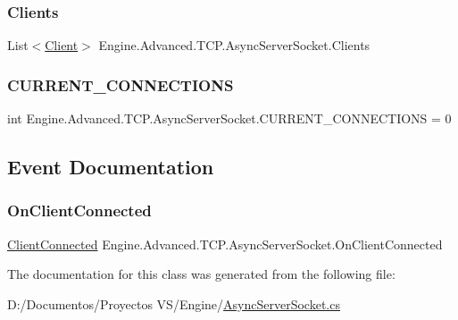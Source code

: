 \subsubsection{\texorpdfstring{Clients}{Clients}}
{\footnotesize\ttfamily List$<$\mbox{\hyperlink{class_engine_1_1_advanced_1_1_t_c_p_1_1_async_server_socket_1_1_client}{Client}}$>$ Engine.\+Advanced.\+T\+C\+P.\+Async\+Server\+Socket.\+Clients}

\mbox{\label{class_engine_1_1_advanced_1_1_t_c_p_1_1_async_server_socket_a6018856640fe917e6e5836bcb05eb70b}} 
\subsubsection{\texorpdfstring{CURRENT\_CONNECTIONS}{CURRENT\_CONNECTIONS}}
{\footnotesize\ttfamily int Engine.\+Advanced.\+T\+C\+P.\+Async\+Server\+Socket.\+C\+U\+R\+R\+E\+N\+T\+\_\+\+C\+O\+N\+N\+E\+C\+T\+I\+O\+NS = 0}



\subsection{Event Documentation}
\mbox{\label{class_engine_1_1_advanced_1_1_t_c_p_1_1_async_server_socket_a4ecb7de8eaee268deadc0b2a921daa8d}} 
\subsubsection{\texorpdfstring{OnClientConnected}{OnClientConnected}}
{\footnotesize\ttfamily \mbox{\hyperlink{class_engine_1_1_advanced_1_1_t_c_p_1_1_async_server_socket_a5ef0e8ba1403714516d655edff0c24d6}{Client\+Connected}} Engine.\+Advanced.\+T\+C\+P.\+Async\+Server\+Socket.\+On\+Client\+Connected}



The documentation for this class was generated from the following file\+:\begin{DoxyCompactItemize}
\item 
D\+:/\+Documentos/\+Proyectos V\+S/\+Engine/\mbox{\hyperlink{_async_server_socket_8cs}{Async\+Server\+Socket.\+cs}}\end{DoxyCompactItemize}
